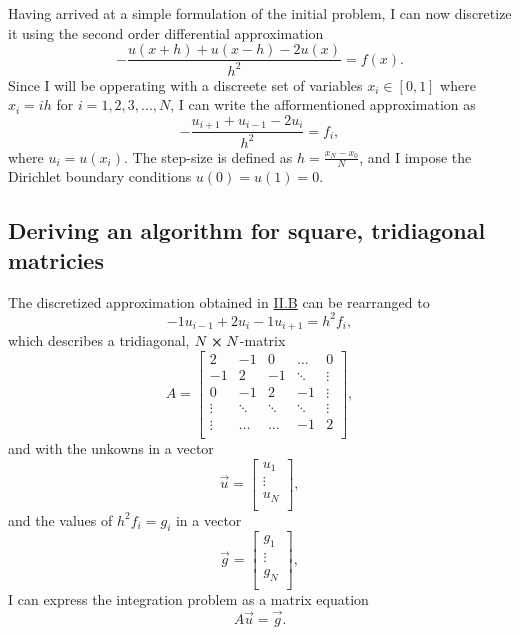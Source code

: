 \documentclass[english,notitlepage,reprint]{revtex4-1}  %
\begin{document}
Having arrived at a simple formulation of the initial problem, I can now discretize it using the second order differential approximation
$$
	-\frac{u(x+h)+u(x-h)-2u(x)}{h^{2}}=f(x).
$$
Since I will be opperating with a discreete set of variables \(x_{i}\in[0,1]\) where \(x_{i}=ih\) for \(i=1,2,3,...,N\), I can write the afformentioned approximation as
$$
	-\frac{u_{i+1}+u_{i-1}-2u_{i}}{h^{2}}=f_{i},
$$
where \(u_{i}=u(x_{i})\). The step-size is defined as \(h=\frac{x_{N}-x_{0}}{N}\), and I impose the Dirichlet boundary conditions \(u(0)=u(1)=0\)\citep{DepartmentofPhysics2019}.

\subsection{Deriving an algorithm for square, tridiagonal matricies}\label{subsec:22}

The discretized approximation obtained in \hyperref[subsec:21]{II.B} can be rearranged to
$$
	-1u_{i-1}+2u_{i}-1u_{i+1}=h^{2}f_{i},
$$
which describes a tridiagonal, \(N\cross N\)-matrix
$$
	A =
	\begin{bmatrix}
	2 & -1 & 0 & \dots & 0 \\
	-1 & 2 & -1 & \ddots &\vdots \\
	0 & -1 & 2 & -1 & \vdots \\
	\vdots & \ddots & \ddots & \ddots & \vdots \\
	\vdots & \dots & \dots & -1 & 2 \\
	\end{bmatrix},
$$
and with the unkowns in a vector
$$
	\vec{u} =
	\begin{bmatrix}
		u_{1} \\
		\vdots \\
		u_{N} \\
	\end{bmatrix},
$$
and the values of \(h^{2}f_{i} = g_{i}\) in a vector
$$
	\vec{g} =
	\begin{bmatrix}
		g_{1} \\
		\vdots \\
		g_{N} \\
	\end{bmatrix},
$$
I can express the integration problem as a matrix equation
$$
	A\vec{u}=\vec{g}.
$$
\end{document}
